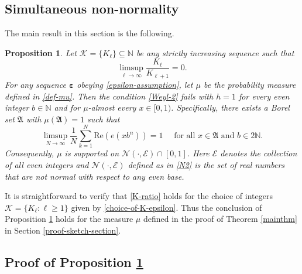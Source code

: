 \documentclass[12pt, twoside]{article}
\newtheorem{proposition}[theorem]{Proposition}
\theoremstyle{definition}
\numberwithin{equation}{section}
\begin{document}
\subsection{Simultaneous non-normality}
The main result in this section is the following. 
\begin{proposition} \label{prop2}
Let $\mathcal K = \{K_{\ell}\} \subseteq \mathbb N$ be any strictly increasing sequence such that 
\begin{equation} \label{K-ratio}
\limsup_{\ell \rightarrow \infty} \frac{K_{\ell}}{K_{\ell+1}} = 0.   
\end{equation} 
For any sequence $\pmb{\varepsilon}$ obeying \eqref{epsilon-assumption}, let $\mu$ be the probability measure defined in \eqref{def-mu}. Then the condition \eqref{Weyl-2} fails with $h = 1$ for every even integer $b \in \mathbb N$ and for $\mu$-almost every $x \in [0,1)$. Specifically, there exists a Borel set $\mathfrak A$ with $\mu(\mathfrak A) = 1$ such that 
\begin{equation} \label{non-normal-condition}
 \limsup_{N \rightarrow \infty} \frac{1}{N} \sum_{k=1}^{N} \text{Re}(e(xb^n)) = 1  \quad \text{  for all $x \in \mathfrak A$ and } b \in 2\mathbb N.   
 \end{equation} 
Consequently, $\mu$ is supported on $\mathscr N(\cdot, \mathscr{E}) \cap [0,1]$. Here $\mathscr{E}$ denotes the collection of all even integers and $\mathscr N(\cdot, \mathscr E)$ defined as in \eqref{N2} is the set of real numbers that are not normal with respect to any even base.  
\end{proposition} 
\noindent It is straightforward to verify that \eqref{K-ratio} holds for the choice of integers $\mathcal K = \{K_{\ell}: \ell \geq 1\}$ given by \eqref{choice-of-K-epsilon}. Thus the conclusion of Proposition \ref{prop2} holds for the measure $\mu$ defined in the proof of Theorem \ref{mainthm} in Section \ref{proof-sketch-section}.   
\subsection{Proof of Proposition \ref{prop2}}
\end{document}
